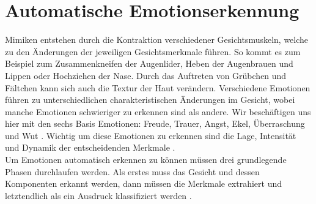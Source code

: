 \documentclass[12pt,a4paper,headinclude,twoside, plainheadsepline, open=right,numbers=noenddot]{scrreprt}
\begin{document}
\chapter{Automatische Emotionserkennung}
\label{Automatische Emotionserkennung}
Mimiken entstehen durch die Kontraktion verschiedener Gesichtsmuskeln, welche zu den Änderungen der jeweiligen Gesichtsmerkmale führen. So kommt es zum Beispiel zum Zusammenkneifen der Augenlider, Heben der Augenbrauen und Lippen oder Hochziehen der Nase. Durch das Auftreten von Grübchen und Fältchen kann sich auch die Textur der Haut verändern. Verschiedene Emotionen führen zu unterschiedlichen charakteristischen Änderungen im Gesicht, wobei manche Emotionen schwieriger zu erkennen sind als andere. Wir beschäftigen uns hier mit den sechs Basis Emotionen: Freude, Trauer, Angst, Ekel, Überraschung und Wut \cite{Fasel2002AutomaticFacialExpressionsAnalysis}. Wichtig um diese Emotionen zu erkennen sind die Lage, Intensität und Dynamik der entscheidenden Merkmale \cite{Fasel2002AutomaticFacialExpressionsAnalysis}. \\
Um Emotionen automatisch erkennen zu können müssen drei grundlegende Phasen durchlaufen werden. Als erstes muss das Gesicht und dessen Komponenten erkannt werden, dann müssen die Merkmale extrahiert und letztendlich als ein Ausdruck klassifiziert werden \cite{Ko2018FacialEmotionRecognition}.
\end{document}
